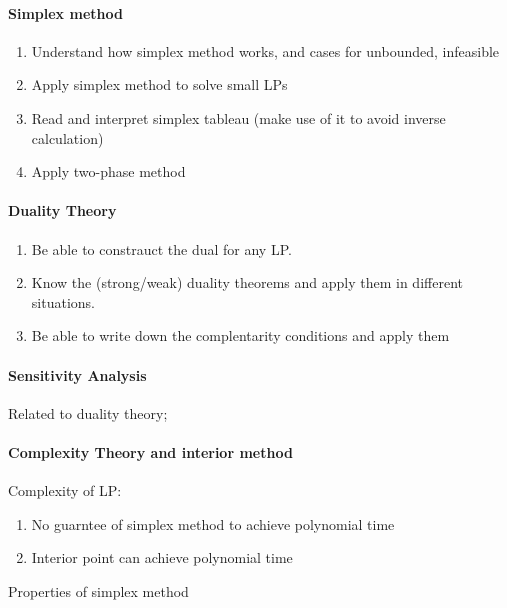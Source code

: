 \paragraph{Simplex method}
\begin{enumerate}
\item
Understand how simplex method works, and cases for unbounded, infeasible
\item
Apply simplex method to solve small LPs
\item
Read and interpret simplex tableau (make use of it to avoid inverse calculation)
\item
Apply two-phase method
\end{enumerate}




\paragraph{Duality Theory}
\begin{enumerate}
\item
Be able to constrauct the dual for any LP.
\item
Know the (strong/weak) duality theorems and apply them in different situations.
\item
Be able to write down the complentarity conditions and apply them



\end{enumerate}



\paragraph{Sensitivity Analysis}
Related to duality theory; 




\paragraph{Complexity Theory and interior method}
Complexity of LP:
\begin{enumerate}
\item
No guarntee of simplex method to achieve polynomial time
\item
Interior point can achieve polynomial time
\end{enumerate}

Properties of simplex method



























